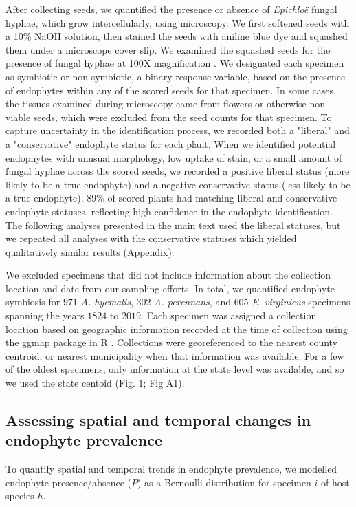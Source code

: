 \documentclass[11pt]{article}
\begin{document}
After collecting seeds, we quantified the presence or absence of \emph{Epichloë} fungal hyphae, which grow intercellularly, using microscopy. We first softened seeds with a 10\% NaOH solution, then stained the seeds with aniline blue dye and squashed them under a microscope cover slip. 
We examined the squashed seeds for the presence of fungal hyphae at 100X magnification \cite{bacon2018stains}.
We designated each specimen as symbiotic or non-symbiotic, a binary response variable, based on the presence of endophytes within any of the scored seeds for that specimen. 
In some cases, the tissues examined during microscopy came from flowers or otherwise non-viable seeds, which were excluded from the seed counts for that specimen.
To capture uncertainty in the identification process, we recorded both a "liberal" and a "conservative" endophyte status for each plant.  
When we identified potential endophytes with unusual morphology, low uptake of stain, or a small amount of fungal hyphae across the scored seeds, we recorded a positive liberal status (more likely to be a true endophyte) and a negative conservative status (less likely to be a true endophyte). 
$89$\% of scored plants had matching liberal and conservative endophyte statuses, reflecting high confidence in the endophyte identification.
The following analyses presented in the main text used the liberal statuses, but we repeated all analyses with the conservative statuses which yielded qualitatively similar results (Appendix). 

We excluded specimens that did not include information about the collection location and date from our sampling efforts.
In total, we quantified endophyte symbiosis for $971$ \emph{A. hyemalis}, $302$ \emph{A. perennans}, and $605$ \emph{E. virginicus} specimens spanning the years $1824$ to $2019$.
Each specimen was assigned a collection location based on geographic information recorded at the time of collection using the ggmap package in R \citep{kahle2019package}. 
Collections were georeferenced to the nearest county centroid, or nearest municipality when that information was available. For a few of the oldest specimens, only information at the state level was available, and so we used the state centoid (Fig. 1; Fig A1).


\subsection*{Assessing spatial and temporal changes in endophyte prevalence}
To quantify spatial and temporal trends in endophyte prevalence, we modelled endophyte presence/absence ($P$) as a Bernoulli distribution for specimen $i$ of host species $h$.
\end{document}
